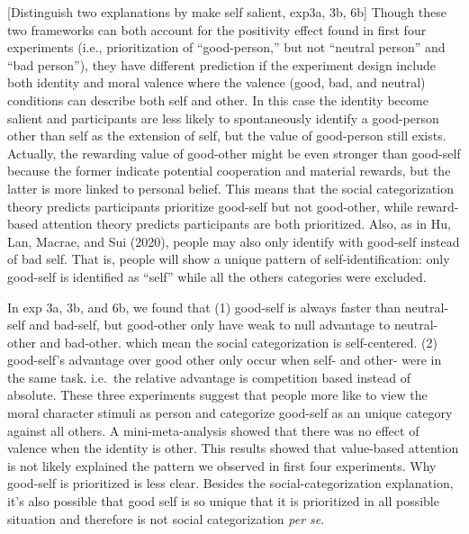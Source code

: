 \documentclass[
  english,
  man]{apa6}
\begin{document}
{[}Distinguish two explanations by make self salient, exp3a, 3b, 6b{]} Though these two frameworks can both account for the positivity effect found in first four experiments (i.e., prioritization of ``good-person,'' but not ``neutral person'' and ``bad person''), they have different prediction if the experiment design include both identity and moral valence where the valence (good, bad, and neutral) conditions can describe both self and other. In this case the identity become salient and participants are less likely to spontaneously identify a good-person other than self as the extension of self, but the value of good-person still exists. Actually, the rewarding value of good-other might be even stronger than good-self because the former indicate potential cooperation and material rewards, but the latter is more linked to personal belief. This means that the social categorization theory predicts participants prioritize good-self but not good-other, while reward-based attention theory predicts participants are both prioritized. Also, as in Hu, Lan, Macrae, and Sui (2020), people may also only identify with good-self instead of bad self. That is, people will show a unique pattern of self-identification: only good-self is identified as ``self'' while all the others categories were excluded.

In exp 3a, 3b, and 6b, we found that (1) good-self is always faster than neutral-self and bad-self, but good-other only have weak to null advantage to neutral-other and bad-other. which mean the social categorization is self-centered. (2) good-self's advantage over good other only occur when self- and other- were in the same task. i.e.~the relative advantage is competition based instead of absolute. These three experiments suggest that people more like to view the moral character stimuli as person and categorize good-self as an unique category against all others. A mini-meta-analysis showed that there was no effect of valence when the identity is other. This results showed that value-based attention is not likely explained the pattern we observed in first four experiments. Why good-self is prioritized is less clear. Besides the social-categorization explanation, it's also possible that good self is so unique that it is prioritized in all possible situation and therefore is not social categorization \emph{per se}.
\end{document}
